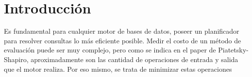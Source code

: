 \section{Introducción}

\quad Es fundamental para cualquier motor de bases de datos, poseer un planificador para resolver consultas lo más eficiente posible. Medir el costo de un método de evaluación puede ser muy complejo, pero como se indica en el paper de Piatetsky-Shapiro, aproximadamente son las cantidad de operaciones de entrada y salida que el motor realiza. Por eso mismo, se trata de minimizar estas operaciones
